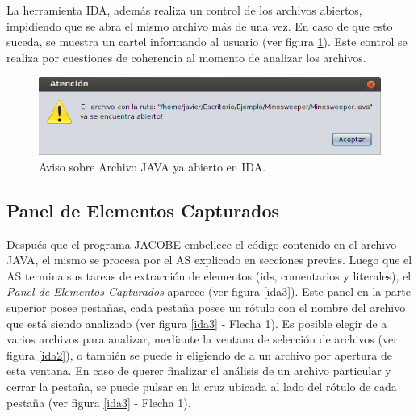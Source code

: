 La herramienta IDA, además realiza un control de los archivos abiertos, impidiendo que se abra el mismo archivo más de una vez. En caso de que esto suceda, se muestra un cartel informando al usuario (ver figura \ref{idaWar2}). Este control se realiza por cuestiones de coherencia al momento de analizar los archivos.


\begin{figure}[t] %
\centerline{%
\includegraphics[scale= 0.8]{./cap4/ida_war_02.png}
}
\caption{Aviso sobre Archivo JAVA ya abierto en IDA.}
\label{idaWar2}
\end{figure}

\subsection{Panel de Elementos Capturados}

Después que el programa JACOBE embellece el código contenido en el archivo JAVA,
el mismo se procesa por el AS explicado en secciones previas. Luego que el AS termina sus tareas de extracción de elementos (ids, comentarios y literales), el \textit{Panel de Elementos Capturados} aparece (ver figura \ref{ida3}). Este panel en la parte superior posee pestañas, cada pestaña posee un rótulo con el nombre del archivo que está siendo analizado (ver figura \ref{ida3} - Flecha 1). Es posible elegir de a varios archivos para analizar, mediante la ventana de selección de archivos (ver figura \ref{ida2}), o también se puede ir eligiendo de a un archivo por apertura de esta ventana.  En caso de querer finalizar el análisis de un archivo particular y cerrar la pestaña, se puede pulsar en la cruz ubicada al lado del rótulo de cada pestaña (ver figura \ref{ida3} - Flecha 1).

